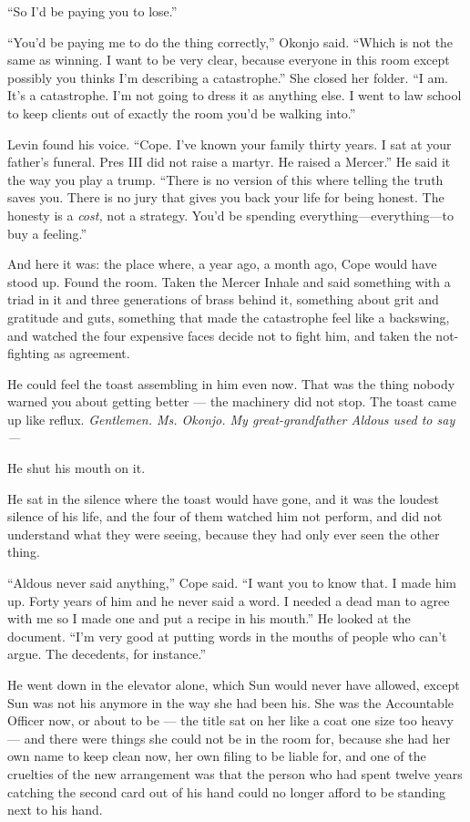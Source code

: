 \documentclass[11pt,openany]{book}
\newcommand{\scenebreak}{\par\vspace{0.5\baselineskip}\begin{center}\textasteriskcentered\quad\textasteriskcentered\quad\textasteriskcentered\end{center}\vspace{0.5\baselineskip}\par}
\begin{document}
``So I'd be paying you to lose.''

``You'd be paying me to do the thing correctly,'' Okonjo said. ``Which is not the same as winning. I want to be very clear, because everyone in this room except possibly you thinks I'm describing a catastrophe.'' She closed her folder. ``I am. It's a catastrophe. I'm not going to dress it as anything else. I went to law school to keep clients out of exactly the room you'd be walking into.''

Levin found his voice. ``Cope. I've known your family thirty years. I sat at your father's funeral. Pres III did not raise a martyr. He raised a Mercer.'' He said it the way you play a trump. ``There is no version of this where telling the truth saves you. There is no jury that gives you back your life for being honest. The honesty is a \textit{cost,} not a strategy. You'd be spending everything---everything---to buy a feeling.''

And here it was: the place where, a year ago, a month ago, Cope would have stood up. Found the room. Taken the Mercer Inhale and said something with a triad in it and three generations of brass behind it, something about grit and gratitude and guts, something that made the catastrophe feel like a backswing, and watched the four expensive faces decide not to fight him, and taken the not-fighting as agreement.

He could feel the toast assembling in him even now. That was the thing nobody warned you about getting better --- the machinery did not stop. The toast came up like reflux. \textit{Gentlemen. Ms. Okonjo. My great-grandfather Aldous used to say---}

He shut his mouth on it.

He sat in the silence where the toast would have gone, and it was the loudest silence of his life, and the four of them watched him not perform, and did not understand what they were seeing, because they had only ever seen the other thing.

``Aldous never said anything,'' Cope said. ``I want you to know that. I made him up. Forty years of him and he never said a word. I needed a dead man to agree with me so I made one and put a recipe in his mouth.'' He looked at the document. ``I'm very good at putting words in the mouths of people who can't argue. The decedents, for instance.''


\scenebreak


He went down in the elevator alone, which Sun would never have allowed, except Sun was not his anymore in the way she had been his. She was the Accountable Officer now, or about to be --- the title sat on her like a coat one size too heavy --- and there were things she could not be in the room for, because she had her own name to keep clean now, her own filing to be liable for, and one of the cruelties of the new arrangement was that the person who had spent twelve years catching the second card out of his hand could no longer afford to be standing next to his hand.
\end{document}
